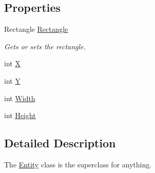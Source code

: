 \subsection*{Properties}
\begin{DoxyCompactItemize}
\item 
Rectangle \hyperlink{class_athena_engine_1_1_framework_1_1_primatives_1_1_entity_a7d7668b0626f6b13a6926fea2ce06750}{Rectangle}
\begin{DoxyCompactList}\small\item\em Gets or sets the rectangle. \end{DoxyCompactList}\item 
int \hyperlink{class_athena_engine_1_1_framework_1_1_primatives_1_1_entity_a8cad715272e9bed7c5d103ccdb439fc4}{X}
\item 
int \hyperlink{class_athena_engine_1_1_framework_1_1_primatives_1_1_entity_add42f9406176b93a9996ebc2dd267f02}{Y}
\item 
int \hyperlink{class_athena_engine_1_1_framework_1_1_primatives_1_1_entity_aa5e4a2cef8f6796349b80bb7dfcc4995}{Width}
\item 
int \hyperlink{class_athena_engine_1_1_framework_1_1_primatives_1_1_entity_ad259a20d595b96451736fb9f21d7fcbd}{Height}
\end{DoxyCompactItemize}


\subsection{Detailed Description}
The \hyperlink{class_athena_engine_1_1_framework_1_1_primatives_1_1_entity}{Entity} class is the superclass for anything. 



